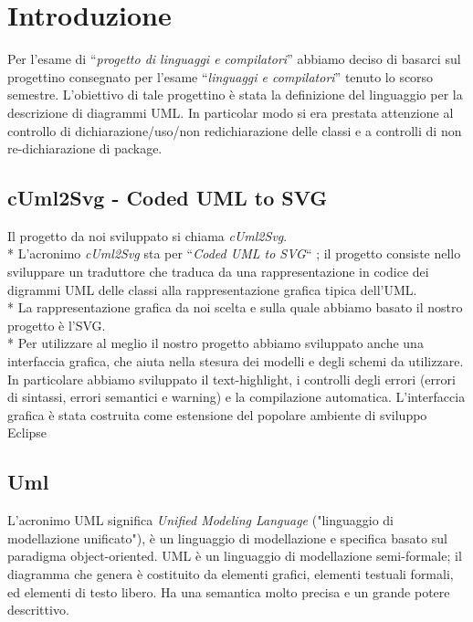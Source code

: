 \chapter{Introduzione}

Per l'esame di ``\emph{progetto di linguaggi e compilatori}'' abbiamo deciso di
basarci sul progettino consegnato per l'esame ``\emph{linguaggi e compilatori}''
tenuto lo scorso semestre.
L'obiettivo di tale progettino è stata la definizione del linguaggio per la 
descrizione di diagrammi UML. In particolar modo si era prestata attenzione al
controllo di dichiarazione/uso/non redichiarazione
delle classi e a controlli di non re-dichiarazione di package.


\section{cUml2Svg - Coded UML to SVG} 
Il progetto da noi sviluppato si chiama \emph{cUml2Svg}. \\*  
L'acronimo \emph{cUml2Svg} sta per ``\emph{Coded UML to SVG}`` ; 
il progetto consiste nello sviluppare un traduttore che traduca da una
rappresentazione in codice dei digrammi UML delle classi alla rappresentazione
grafica tipica dell'UML.\\*
La rappresentazione grafica da noi scelta e sulla quale abbiamo basato il nostro
progetto è l'SVG. \\*
Per utilizzare al meglio il nostro progetto abbiamo sviluppato anche una 
interfaccia grafica, che aiuta nella stesura dei modelli e degli schemi da
utilizzare. In particolare abbiamo sviluppato il text-highlight, i
controlli degli errori (errori di sintassi, errori semantici e warning) e la
compilazione automatica.
L'interfaccia grafica è stata costruita come estensione del popolare ambiente 
 di sviluppo Eclipse~\cite{eclipse_website:1}


\section{Uml}  

L'acronimo UML significa \emph{Unified Modeling Language} ("linguaggio di modellazione
unificato"), è un linguaggio di modellazione e specifica basato sul paradigma object-oriented. 
UML è un linguaggio di modellazione semi-formale; il diagramma che genera è costituito da elementi
grafici, elementi testuali formali, ed elementi di testo libero. Ha una semantica molto precisa e un
grande potere descrittivo.



